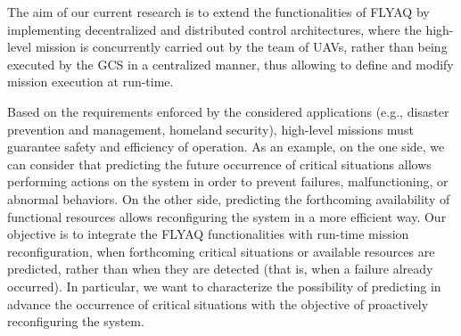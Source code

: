 \documentclass[letterpaper, 10 pt, conference]{ieeeconf}
\begin{document}
The aim of our current research is to extend the functionalities of FLYAQ by implementing  decentralized and distributed control architectures, 
where the high-level mission is concurrently carried out by the team of UAVs, rather than being executed by the GCS in a centralized manner, thus allowing to define and modify mission execution at run-time.
%
%

Based on the requirements enforced by the considered applications (e.g., disaster prevention and management, homeland security), high-level missions must guarantee safety and efficiency of operation. 
As an example, on the one side, we can consider that predicting the future occurrence of critical situations allows performing actions on the system in order to prevent failures, malfunctioning, or abnormal behaviors. On the other side, predicting the forthcoming availability of functional resources allows reconfiguring the system in a more efficient way.
Our objective is to integrate the FLYAQ functionalities with run-time mission reconfiguration, when forthcoming critical situations or available resources are predicted, rather than when they are detected (that is, when a failure already occurred). In particular, we want to characterize the possibility of predicting in advance the occurrence of critical situations with the objective of proactively reconfiguring the system.
\end{document}
